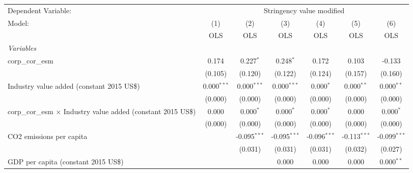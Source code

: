 
\begingroup
\centering
\begin{tabular}{lcccccc}
   \toprule
   Dependent Variable: & \multicolumn{6}{c}{Stringency value modified}\\
   Model:                                                                & (1)           & (2)            & (3)            & (4)            & (5)            & (6)\\  
                                                                         &  OLS          & OLS            & OLS            & OLS            & OLS            & OLS\\  
   \midrule
   \emph{Variables}\\
   corp\_cor\_esm                                                        & 0.174         & 0.227$^{*}$    & 0.248$^{*}$    & 0.172          & 0.103          & -0.133\\   
                                                                         & (0.105)       & (0.120)        & (0.122)        & (0.124)        & (0.157)        & (0.160)\\   
   Industry value added (constant 2015 US\$)                             & 0.000$^{***}$ & 0.000$^{***}$  & 0.000$^{***}$  & 0.000$^{*}$    & 0.000$^{**}$   & 0.000$^{**}$\\   
                                                                         & (0.000)       & (0.000)        & (0.000)        & (0.000)        & (0.000)        & (0.000)\\   
   corp\_cor\_esm $\times$ Industry value added (constant 2015 US\$)     & 0.000         & 0.000$^{*}$    & 0.000$^{*}$    & 0.000$^{*}$    & 0.000          & 0.000$^{*}$\\   
                                                                         & (0.000)       & (0.000)        & (0.000)        & (0.000)        & (0.000)        & (0.000)\\   
   CO2 emissions per capita                                              &               & -0.095$^{***}$ & -0.095$^{***}$ & -0.096$^{***}$ & -0.113$^{***}$ & -0.099$^{***}$\\   
                                                                         &               & (0.031)        & (0.031)        & (0.031)        & (0.032)        & (0.027)\\   
   GDP per capita (constant 2015 US\$)                                   &               &                & 0.000          & 0.000          & 0.000          & 0.000$^{**}$\\   

\end{tabular}
